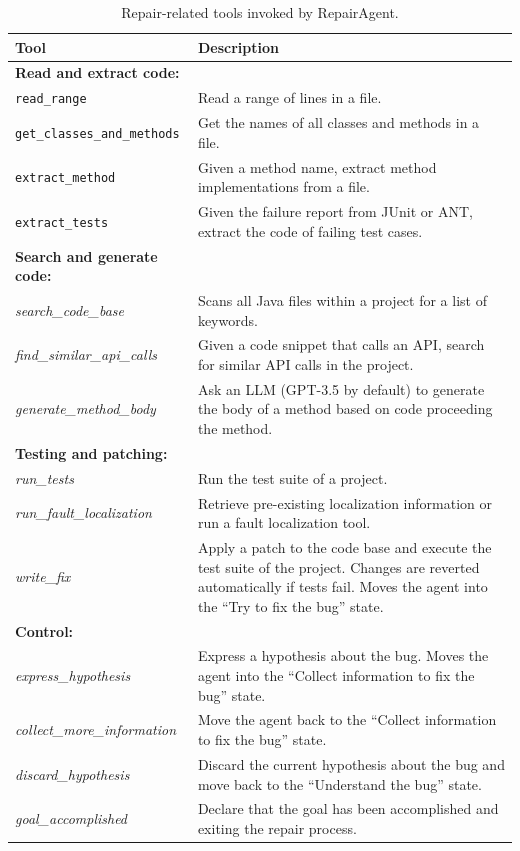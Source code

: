 \documentclass[manuscript,review]{acmart}
\begin{document}
\begin{table}[htbp]
\caption{Repair-related tools invoked by RepairAgent.}
\centering
\small 
\def\arraystretch{1.1} 
\begin{tabularx}{\textwidth}{l X}
\toprule
Tool & Description \\
\midrule
\textbf{Read and extract code:} & \\
\texttt{read\_range} & Read a range of lines in a file. \\
\texttt{get\_classes\_and\_methods} & Get the names of all classes and methods in a file. \\
\texttt{extract\_method} & Given a method name, extract method implementations from a file. \\
\texttt{extract\_tests} & Given the failure report from JUnit or ANT, extract the code of failing test cases. \\
\midrule
\textbf{Search and generate code:} & \\
\textit{search\_code\_base} & Scans all Java files within a project for a list of keywords. \\
\textit{find\_similar\_api\_calls} & Given a code snippet that calls an API, search for similar API calls in the project. \\
\textit{generate\_method\_body} & Ask an LLM (GPT-3.5 by default) to generate the body of a method based on code proceeding the method. \\
\midrule
\textbf{Testing and patching:} & \\
\textit{run\_tests} & Run the test suite of a project. \\
\textit{run\_fault\_localization} & Retrieve pre-existing localization information or run a fault localization tool. \\
\textit{write\_fix} & Apply a patch to the code base and execute the test suite of the project. Changes are reverted automatically if tests fail. Moves the agent into the ``Try to fix the bug'' state. \\
\midrule
\textbf{Control:} & \\
\textit{express\_hypothesis} & Express a hypothesis about the bug. Moves the agent into the ``Collect information to fix the bug'' state. \\
\textit{collect\_more\_information} & Move the agent back to the ``Collect information to fix the bug'' state. \\
\textit{discard\_hypothesis} & Discard the current hypothesis about the bug and move back to the ``Understand the bug'' state. \\
\textit{goal\_accomplished} & Declare that the goal has been accomplished and exiting the repair process. \\
\bottomrule
\end{tabularx}
\end{table}
\end{document}
